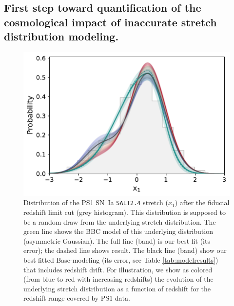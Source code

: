 \documentclass[]{aa} %
\begin{document}
\subsection{First step toward quantification of the cosmological impact of
inaccurate stretch distribution modeling.}

\begin{figure}
    \centering
    \includegraphics[width=\linewidth]{Article_figures/bbc_comp_PS1_hist-nr.pdf}
    \caption{Distribution of the PS1 SN~Ia \textsc{\texttt{SALT2.4}} stretch
        ($x_1$) after the fiducial redshift limit cut (grey histogram). This
        distribution is supposed to be a random draw from the underlying stretch
        distribution. The green line shows the BBC model of this underlying
        distribution (asymmetric Gaussian). The full line (band) is our best fit
        (its error); the dashed line shows \cite{scolnic2018a} result. The black
        line (band) show our best fitted Base-modeling (its error, see Table
        \ref{tab:modelresults}) that includes redshift drift. For illustration,
        we show as colored (from blue to red with increasing redshifts) the
        evolution of the underlying stretch distribution as a function of
        redshift for the redshift range covered by PS1 data.}
    \label{fig:bbc_pdf_ps1}
\end{figure}
\end{document}

